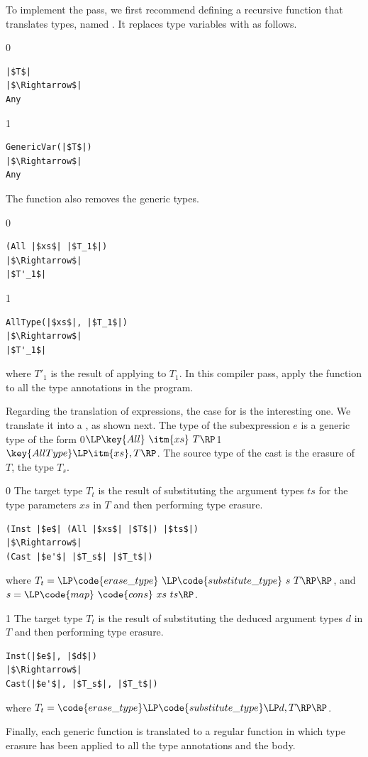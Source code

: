 \documentclass[7x10]{TimesAPriori_MIT}%
\def\racketEd{0}
\def\pythonEd{1}
\def\edition{1}
\newcommand{\racket}[1]{{\if\edition\racketEd{#1}\fi}}
\newcommand{\pythonColor}[0]{}
\newcommand{\python}[1]{{\if\edition\pythonEd\pythonColor #1\fi}}
\numberwithin{theorem}{chapter}
\numberwithin{definition}{chapter}
\numberwithin{equation}{chapter}
\begin{document}
To implement the  pass, we first recommend defining
a recursive function that translates types, named
. It replaces type variables with \CANYTY{} as
follows.
%
{\if\edition\racketEd
\begin{lstlisting}
|$T$|
|$\Rightarrow$|
Any
\end{lstlisting}
\fi}
{\if\edition\pythonEd\pythonColor
\begin{lstlisting}
GenericVar(|$T$|)
|$\Rightarrow$|
Any
\end{lstlisting}
\fi}
%
\noindent The  function also removes the generic
 types.
%
{\if\edition\racketEd
\begin{lstlisting}
(All |$xs$| |$T_1$|)
|$\Rightarrow$|
|$T'_1$|
\end{lstlisting}
\fi}
{\if\edition\pythonEd\pythonColor
\begin{lstlisting}
AllType(|$xs$|, |$T_1$|)
|$\Rightarrow$|
|$T'_1$|
\end{lstlisting}
\fi}
\noindent where $T'_1$ is the result of applying  to
$T_1$.
%
In this compiler pass, apply the  function to all 
the type annotations in the program.

Regarding the translation of expressions, the case for  is
the interesting one. We translate it into a , as shown
next.
The type of the subexpression $e$ is a generic type of the form
\racket{$\LP\key{All}~\itm{xs}~T\RP$}\python{$\key{AllType}\LP\itm{xs}, T\RP$}.
The source type of the cast is the erasure of $T$, the type $T_s$.
%
{\if\edition\racketEd
%
The target type $T_t$ is the result of substituting the argument types
$ts$ for the type parameters $xs$ in $T$ and then performing type
erasure.
%
\begin{lstlisting}
(Inst |$e$| (All |$xs$| |$T$|) |$ts$|)
|$\Rightarrow$|
(Cast |$e'$| |$T_s$| |$T_t$|)
\end{lstlisting}
%
where $T_t = \LP\code{erase\_type}~\LP\code{substitute\_type}~s~T\RP\RP$,
and $s = \LP\code{map}~\code{cons}~xs~ts\RP$.
\fi}
{\if\edition\pythonEd\pythonColor
%
The target type $T_t$ is the result of substituting the deduced
argument types $d$ in $T$ and then performing type erasure.
%
\begin{lstlisting}
Inst(|$e$|, |$d$|)
|$\Rightarrow$|
Cast(|$e'$|, |$T_s$|, |$T_t$|)
\end{lstlisting}
%
where
$T_t = \code{erase\_type}\LP\code{substitute\_type}\LP d, T\RP\RP$.
\fi}

Finally, each generic function is translated to a regular
function in which type erasure has been applied to all the type
annotations and the body.
\end{document}
